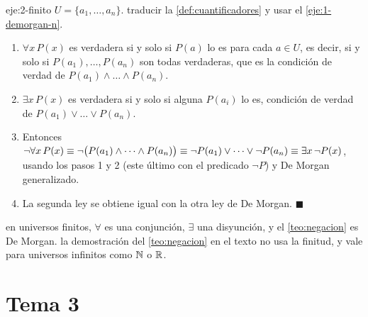 \begin{solucion}{eje:2-finito}
\datos $U=\{a_1,\dots,a_n\}$.
\planteamiento traducir la \cref{def:cuantificadores} y usar el \cref{eje:1-demorgan-n}.
\pasos
\begin{enumerate}[label=\arabic*.]
  \item $\forall x\,P(x)$ es verdadera si y solo si $P(a)$ lo es para cada $a\in U$, es decir, si y solo si $P(a_1),\dots,P(a_n)$ son todas verdaderas, que es la condición de verdad de $P(a_1)\wedge\dots\wedge P(a_n)$.
  \item $\exists x\,P(x)$ es verdadera si y solo si alguna $P(a_i)$ lo es, condición de verdad de $P(a_1)\vee\dots\vee P(a_n)$.
  \item Entonces $\neg\forall x\,P(x)\equiv\neg\bigl(P(a_1)\wedge\dots\wedge P(a_n)\bigr)\equiv\neg P(a_1)\vee\dots\vee\neg P(a_n)\equiv\exists x\,\neg P(x)$, usando los pasos 1 y 2 (este último con el predicado $\neg P$) y De Morgan generalizado.
  \item La segunda ley se obtiene igual con la otra ley de De Morgan. $\blacksquare$
\end{enumerate}
\resultado en universos finitos, $\forall$ es una conjunción, $\exists$ una disyunción, y el \cref{teo:negacion} es De Morgan.
\comprobacion la demostración del \cref{teo:negacion} en el texto no usa la finitud, y vale para universos infinitos como $\mathbb{N}$ o $\mathbb{R}$.
\end{solucion}

\section{Tema 3}

